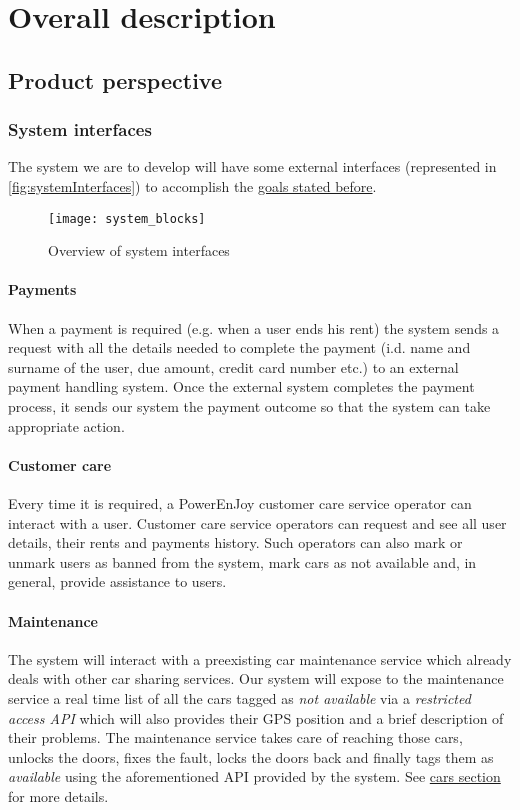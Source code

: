 \section{Overall description}
\subsection{Product perspective}
	\subsubsection{System interfaces}
	\label{sec:systemInterfaces}
		The system we are to develop will have some external interfaces (represented in \autoref{fig:systemInterfaces}) to accomplish the \hyperref[sec:goals]{goals stated before}.
		\begin{figure}[h]
			\centering
			\texttt{[image: system\_blocks]}
			\caption{
				\label{fig:systemInterfaces} 
				Overview of system interfaces
			}
		\end{figure}
	\paragraph{Payments}
	When a payment is required (e.g. when a user ends his rent) the system sends a request with all the details needed to complete the payment (i.d. name and surname of the user, due amount, credit card number etc.) to an external payment handling system. Once the external system completes the payment process, it sends our system the payment outcome so that the system can take appropriate action.
	
	\paragraph{Customer care} Every time it is required, a PowerEnJoy customer care service operator can interact with a user. Customer care service operators can request and see all user details, their rents and payments history. Such operators can also mark or unmark users as banned from the system, mark cars as not available and, in general, provide assistance to users.

	\paragraph{Maintenance} The system will interact with a preexisting car maintenance service which already deals with other car sharing services. Our system will expose to the maintenance service a real time list of all the cars tagged as \emph{not available} via a \emph{restricted access API} which will also provides their GPS position and a brief description of their problems. The maintenance service takes care of reaching those cars, unlocks the doors, fixes the fault, locks the doors back and finally tags them as \emph{available} using the aforementioned API provided by the system. See \hyperref[sec:cars]{cars section} for more details.
	
